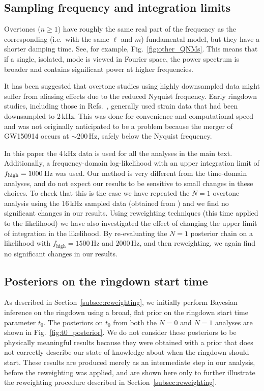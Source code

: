 \subsection{Sampling frequency and integration limits}\label{app:fhigh}

Overtones ($n \geq 1$) have roughly the same real part of the frequency as the corresponding (i.e.\ with the same $\ell$ and $m$) fundamental model, but they have a shorter damping time. 
See, for example, Fig.~\ref{fig:other_QNMs}. 
This means that if a single, isolated, mode is viewed in Fourier space, the power spectrum is broader and contains significant power at higher frequencies.

It has been suggested \cite{WillMaxTGRtelecon} that overtone studies using highly downsampled data might suffer from aliasing effects due to the reduced Nyquist frequency.
Early ringdown studies, including those in Refs.~\cite{LIGOScientific:2016lio, Isi:2019aib, Isi:2022mhy}, generally used strain data that had been downsampled to $2\,$kHz. 
This was done for convenience and computational speed and was not originally anticipated to be a problem because the merger of GW150914 occurs at $\sim 200\,\mathrm{Hz}$, safely below the Nyquist frequency.

In this paper the $4\,$kHz data is used for all the analyses in the main text. 
Additionally, a frequency-domain log-likelihood with an upper integration limit of $f_{\rm high}=1000\,$Hz was used.
Our method is very different from the time-domain analyses, and do not expect our results to be sensitive to small changes in these choices.
To check that this is the case we have repeated the $N=1$ overtone analysis using the $16\,$kHz sampled data (obtained from \cite{gwosc}) and we find no significant changes in our results.
Using reweighting techniques (this time applied to the likelihood) we have also investigated the effect of changing the upper limit of integration in the likelihood. By re-evaluating the $N=1$ posterior chain on a likelihood with $f_\mathrm{ high}=1500\,$Hz and $2000\,$Hz, and then reweighting, we again find no significant changes in our results.


\subsection{Posteriors on the ringdown start time}\label{app:t0_posterior_prior}

As described in Section~\ref{subsec:reweighting}, we initially perform Bayesian inference on the ringdown using a broad, flat prior on the ringdown start time parameter $t_0$. 
The posteriors on $t_0$ from both the $N=0$ and $N=1$ analyses are shown in Fig.~\ref{fig:t0_posterior}.
We do not consider these posteriors to be physically meaningful results because they were obtained with a prior that does not correctly describe our state of knowledge about when the ringdown should start.
These results are produced merely as an intermediate step in our analysis, before the reweighting was applied, and are shown here only to further illustrate the reweighting procedure described in Section~\ref{subsec:reweighting}.

